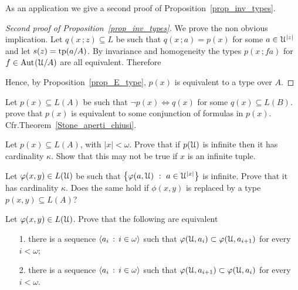 \documentclass[creche.tex]{subfiles}
\begin{document}
As an application we give a second proof of Proposition~\ref{prop_inv_types}.

\begin{proof}[Second proof of Proposition~\ref{prop_inv_types}] We prove the non obvious implication. Let $q(x\,;z)\subseteq L$ be such that $q(x\,;a)= p(x)$ for some $a\in\EuScript U^{|z|}$ and let $s(z)={\rm tp}(a/A)$. By invariance and homogeneity the types $p(x\,;fa)$ for $f\in\textrm{Aut\kern.15ex}(\EuScript U/A)$ are all equivalent. Therefore

\smallskip


Hence, by Proposition~\ref{prop_E_type}, $p(x)$ is equivalent to a type over $A$.
\end{proof}


\begin{exercise}\label{ex_clopen_definibili}
Let $p(x)\subseteq L(A)$ be such that $\neg p(x)\iff q(x)$ for some $q(x)\subseteq L(B)$. prove that $p(x)$ is equivalent to some conjunction of formulas in $p(x)$. Cfr.\@ Theorem~\ref{Stone_aperti_chiusi}.\QED 
\end{exercise}


\begin{exercise}\label{cadinalitafinitasaturazione}
Let $p(x)\subseteq L(A)$, with $|x|<\omega$. Prove that if $p(\EuScript U)$ is infinite then it has cardinality $\kappa$. Show that this may not be true if $x$ is an infinite tuple.\QED 
\end{exercise}

\begin{exercise}\label{cadinalitafinitasaturazioneinsiemi}
Let $\varphi(x,y)\in L(\EuScript U)$ be such that $\big\{\varphi(a,\EuScript U)\ :\ a\in\EuScript U^{|x|}\big\}$ is infinite. Prove that it has cardinality $\kappa$. Does the same hold if $\phi(x,y)$ is replaced by a type $p(x,y)\subseteq L(A)$?\QED 
\end{exercise}

\begin{exercise} 
Let $\varphi(x,y)\in L(\EuScript U)$. Prove that the following are equivalent
\begin{itemize}
\item[1.] there is a sequence $\langle a_i\,:\,i\in\omega\rangle$ such that $\varphi(\EuScript U,a_i)\subset\varphi(\EuScript U,a_{i+1})$ for every $i<\omega$;
\item[2.] there is a sequence $\langle a_i\,:\,i\in\omega\rangle$ such that $\varphi(\EuScript U,a_{i+1})\subset\varphi(\EuScript U,a_i)$ for every $i<\omega$.\QED  
\end{itemize}
\end{exercise}
\end{document}
